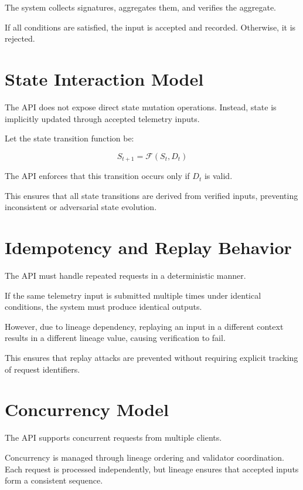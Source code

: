 The system collects signatures, aggregates them, and verifies the aggregate.

If all conditions are satisfied, the input is accepted and recorded. Otherwise, it is rejected.

\section{State Interaction Model}

The API does not expose direct state mutation operations. Instead, state is implicitly updated through accepted telemetry inputs.

Let the state transition function be:

\begin{equation}
S_{t+1} = \mathcal{F}(S_t, D_t)
\end{equation}

The API enforces that this transition occurs only if $D_t$ is valid.

This ensures that all state transitions are derived from verified inputs, preventing inconsistent or adversarial state evolution.

\section{Idempotency and Replay Behavior}

The API must handle repeated requests in a deterministic manner.

If the same telemetry input is submitted multiple times under identical conditions, the system must produce identical outputs.

However, due to lineage dependency, replaying an input in a different context results in a different lineage value, causing verification to fail.

This ensures that replay attacks are prevented without requiring explicit tracking of request identifiers.

\section{Concurrency Model}

The API supports concurrent requests from multiple clients.

Concurrency is managed through lineage ordering and validator coordination. Each request is processed independently, but lineage ensures that accepted inputs form a consistent sequence.

